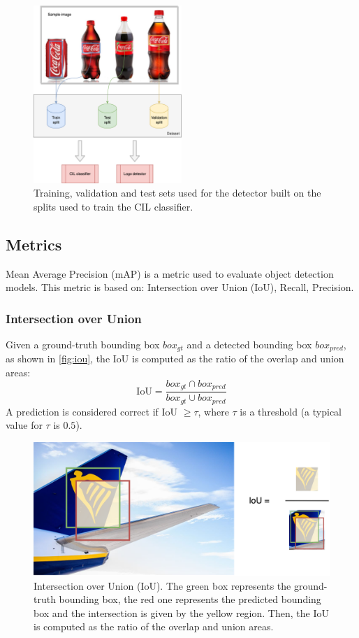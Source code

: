 \begin{figure}[H]
	\centering
    \includegraphics[width=0.5\textwidth]{images/logos-split.drawio.png}
	\caption{Training, validation and test sets used for the detector built on the splits used to train the CIL classifier.}%
	\label{fig:detector-split-dataset}%
\end{figure}

\subsection{Metrics}
Mean Average Precision (mAP) is a metric used to evaluate object detection models. This metric is based on: Intersection over Union (IoU), Recall, Precision.

\subsubsection{Intersection over Union}
Given a ground-truth bounding box $box_{gt}$ and a detected bounding box $box_{pred}$, as shown in \autoref{fig:iou}, the IoU is computed as the ratio of the overlap and union areas:
\begin{equation}
    \text{IoU} = \frac{box_{gt} \cap box_{pred}}{box_{gt} \cup box_{pred}} 
\end{equation}
A prediction is considered correct if IoU $ \geq \tau$, where $\tau$ is a threshold (a typical value for $\tau$ is $0.5$).

\begin{figure}[H]
	\centering
    \includegraphics[width=1\textwidth]{images/iou.drawio.png}
	\caption{Intersection over Union (IoU). The green box represents the ground-truth bounding box, the red one represents the predicted bounding box and the intersection is given by the yellow region. Then, the IoU is computed as the ratio of the overlap and union areas.}
	\label{fig:iou}
\end{figure}

